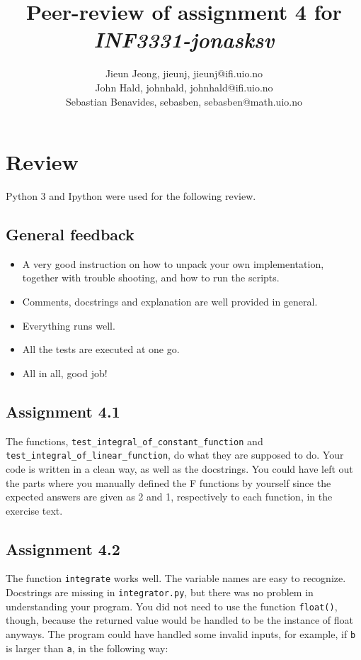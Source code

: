 \documentclass[a4paper]{article}
\title{Peer-review of assignment 4 for \textit{INF3331-jonasksv}}
\author{Jieun Jeong, jieunj, {jieunj@ifi.uio.no} \\
 		John Hald, johnhald, {johnhald@ifi.uio.no} \\
		Sebastian Benavides, sebasben, {sebasben@math.uio.no}}
\begin{document}
\maketitle

\section*{Review}\label{sec:review}

Python 3 and Ipython were used for the following review.

\subsection*{General feedback}

\begin{itemize}
\item A very good instruction on how to unpack your own implementation, together with trouble shooting, and how to run the scripts.
\item Comments, docstrings and explanation are well provided in general.
\item Everything runs well.
\item All the tests are executed at one go.
\item All in all, good job!
\end{itemize}

\subsection*{Assignment 4.1}
The functions, \texttt{test\_integral\_of\_constant\_function} and \texttt{test\_integral\_of\_linear\_function}, do what they are supposed to do. Your code is written in a clean way, as well as the docstrings.
You could have left out the parts where you manually defined the F functions by yourself since the expected answers are given as 2 and 1, respectively to each function, in the exercise text. 

\subsection*{Assignment 4.2}

The function \texttt{integrate} works well. The variable names are easy to recognize. Docstrings are missing in \texttt{integrator.py}, but there was no problem in understanding your program.
You did not need to use the function \texttt{float()}, though, because the returned value would be handled to be the instance of float anyways.
The program could have handled some invalid inputs, for example, if \texttt{b} is larger than \texttt{a}, in the following way:
\end{document}

